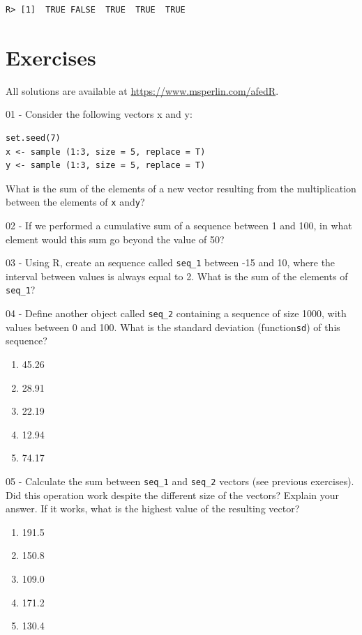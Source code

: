 \documentclass[
  12pt,
]{book}
\providecommand{\tightlist}{%
  \setlength{\itemsep}{0pt}\setlength{\parskip}{0pt}}
\begin{document}
\begin{verbatim}
R> [1]  TRUE FALSE  TRUE  TRUE  TRUE
\end{verbatim}

\hypertarget{exercises-4}{%
\section{Exercises}\label{exercises-4}}

All solutions are available at \url{https://www.msperlin.com/afedR}.

01 -
Consider the following vectors x and y:

\begin{verbatim}
set.seed(7)
x <- sample (1:3, size = 5, replace = T)
y <- sample (1:3, size = 5, replace = T)
\end{verbatim}

What is the sum of the elements of a new vector resulting from the multiplication between the elements of \texttt{x} and\texttt{y}?

02 -
If we performed a cumulative sum of a sequence between 1 and 100, in what element would this sum go beyond the value of 50?

03 -
Using R, create an sequence called \texttt{seq\_1} between -15 and 10, where the interval between values is always equal to 2. What is the sum of the elements of \texttt{seq\_1}?

04 -
Define another object called \texttt{seq\_2} containing a sequence of size 1000, with values between 0 and 100. What is the standard deviation (function\texttt{sd}) of this sequence?

\begin{enumerate}
\def\labelenumi{\alph{enumi})}
\tightlist
\item
  45.26
\item
  28.91
\item
  22.19
\item
  12.94
\item
  74.17
\end{enumerate}

05 -
Calculate the sum between \texttt{seq\_1} and \texttt{seq\_2} vectors (see previous exercises). Did this operation work despite the different size of the vectors? Explain your answer. If it works, what is the highest value of the resulting vector?

\begin{enumerate}
\def\labelenumi{\alph{enumi})}
\tightlist
\item
  191.5
\item
  150.8
\item
  109.0
\item
  171.2
\item
  130.4
\end{enumerate}
\end{document}
